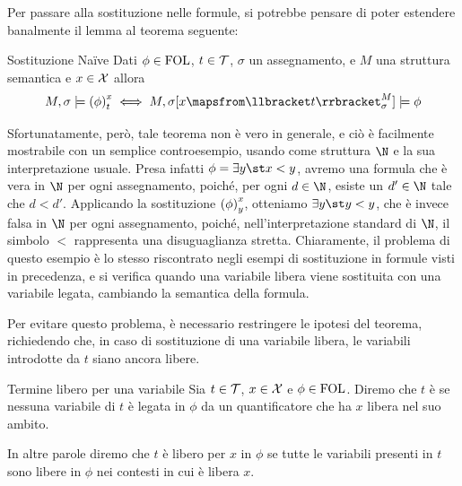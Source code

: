 Per passare alla sostituzione nelle formule, si potrebbe pensare di poter estendere banalmente il lemma al teorema seguente:

\begin{theorem}{Sostituzione Naïve}
  Dati \(\phi\in\FOL\), \(t\in \mathcal{T}\), \(\sigma\) un assegnamento, e \(M\) una struttura semantica e \(x\in\mathcal{X}\) allora
  \[M,\sigma \models \subs{\phi}{x}{t} \iff M,\sigma[x\mapsfrom \den{t}[M][\sigma]] \models \phi\]
\end{theorem}

Sfortunatamente, però, tale teorema non è vero in generale, e ciò è facilmente mostrabile con un semplice controesempio, usando come struttura \(\N\) e la sua interpretazione usuale.
Presa infatti \(\phi = \exists y \st x<y\), avremo una formula che è vera in \(\N\) per ogni assegnamento, poiché, per ogni \(d\in\N\), esiste un \(d'\in\N\) tale che \(d<d'\). Applicando la sostituzione \({{\left(\phi\right)}^{x}_{y}}\), otteniamo \(\exists y \st y<y\), che è invece falsa in \(\N\) per ogni assegnamento, poiché, nell'interpretazione standard di \(\N\), il simbolo \(<\) rappresenta una disuguaglianza stretta. Chiaramente, il problema di questo esempio è lo stesso riscontrato negli esempi di sostituzione in formule visti in precedenza, e si verifica quando una variabile libera viene sostituita con una variabile legata, cambiando la semantica della formula.

Per evitare questo problema, è necessario restringere le ipotesi del teorema, richiedendo che, in caso di sostituzione di una variabile libera, le variabili introdotte da \(t\) siano ancora libere.

\begin{definition}{Termine libero per una variabile}
  Sia \(t\in \mathcal{T}\), \(x\in\mathcal{X}\) e \(\phi \in \FOL\). Diremo che \(t\) è  se nessuna variabile di \(t\) è legata in \(\phi\) da un quantificatore che ha \(x\) libera nel suo ambito.
\end{definition}

In altre parole diremo che \(t\) è libero per \(x\) in \(\phi\) se tutte le variabili presenti in \(t\) sono libere in \(\phi\) nei contesti in cui è libera \(x\).

